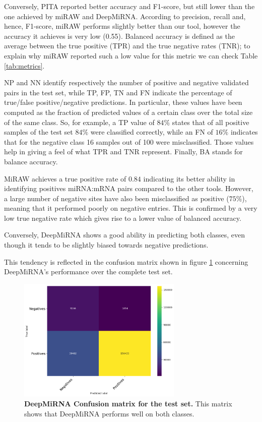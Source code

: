 Conversely, PITA reported better accuracy and F1-score, but still lower than the one achieved by miRAW and DeepMiRNA. According to precision, recall and, hence, F1-score, miRAW performs slightly better than our tool, however the accuracy it achieves is very low (0.55). Balanced accuracy is defined as the average between the true positive (TPR) and the true negative rates (TNR); to explain why miRAW reported such a low value for this metric we can check Table \ref{tab:metrics}.  

NP and NN identify respectively the number of positive and negative validated pairs in the test set, while TP, FP, TN and FN indicate the percentage of true/false positive/negative predictions. 
In particular, these values have been computed as the fraction of predicted values of a certain class over the total size of the same class. So, for example, a TP value of $84\%$ states that of all positive samples of the test set $84\%$ were classified correctly, while an FN of $16\%$ indicates that for the negative class 16 samples out of 100 were misclassified. Those values help in giving a feel of what TPR and TNR represent. Finally, BA stands for balance accuracy.
 
MiRAW achieves a true positive rate of $0.84$ indicating its better ability in identifying positives miRNA:mRNA pairs compared to the other tools. However, a large number of negative sites have also been misclassified as positive ($75\%$), meaning that it performed poorly on negative entries. This is confirmed by a very low true negative rate which gives rise to a lower value of balanced accuracy.

Conversely, DeepMiRNA shows a good ability in predicting both classes, even though it tends to be slightly biased towards negative predictions. 

This tendency is reflected in the confusion matrix shown in figure \ref{fig:confusion_matrix} concerning DeepMiRNA's performance over the complete test set.

\begin{figure}[h!]
	\centering
	\includegraphics[width=0.7\textwidth, height=0.4\textheight]{Figures/conf_matrix}
	\caption{\textbf{DeepMiRNA Confusion matrix for the test set.} This matrix shows that DeepMiRNA performs well on both classes.}
	\label{fig:confusion_matrix}
\end{figure} 
  


 